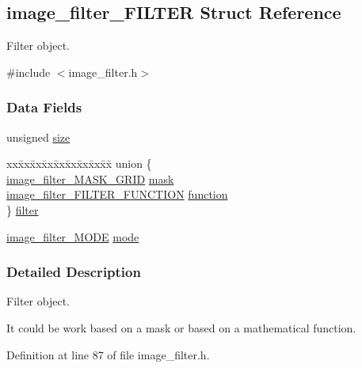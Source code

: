 \hypertarget{a00003}{\subsection{image\-\_\-filter\-\_\-\-F\-I\-L\-T\-E\-R Struct Reference}
\label{a00003}
}


Filter object.  




{\ttfamily \#include $<$image\-\_\-filter.\-h$>$}

\subsubsection*{Data Fields}
\begin{DoxyCompactItemize}
\item 
unsigned \hyperlink{a00003_a3cb3a68755dc1662ae6f82d9d8c0a815}{size}
\item 
\begin{tabbing}
xx\=xx\=xx\=xx\=xx\=xx\=xx\=xx\=xx\=\kill
union \{\\
\>\hyperlink{a00012_a8249e3d997dddbfdce6ef81c25b1f3b3}{image\_filter\_MASK\_GRID} \hyperlink{a00003_acadf8f8421df9be6705f8328b860a87a}{mask}\\
\>\hyperlink{a00012_acaed2c22ba7a7ae3c91fd6a6acb5b19a}{image\_filter\_FILTER\_FUNCTION} \hyperlink{a00003_af9176629481fe4c3923f0b7111c586ee}{function}\\
\} \hyperlink{a00003_a100928ec8ffed698af4efbd084710b1d}{filter}\\

\end{tabbing}\item 
\hyperlink{a00012_abecdf477ce7aa2bb6f4b6b0f218a9eea}{image\-\_\-filter\-\_\-\-M\-O\-D\-E} \hyperlink{a00003_a7b2c5d0f2fefbdf01798414000fc4387}{mode}
\end{DoxyCompactItemize}


\subsubsection{Detailed Description}
Filter object. 

It could be work based on a mask or based on a mathematical function. 

Definition at line 87 of file image\-\_\-filter.\-h.



